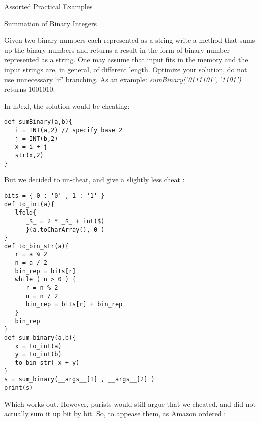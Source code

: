 \begin{section}{Assorted Practical Examples}
\begin{subsection}{Summation of Binary Integers}

Given two binary numbers each represented as a string write a method that sums up the binary numbers 
and returns a result in the form of binary number represented as a string. 
One may assume that input fits in the memory and the input strings are, in general, of different length. 
Optimize your solution, do not use unnecessary `if' branching. 
As an example: \emph{sumBinary('0111101', '1101')} returns  $1001010$.

In nJexl, the solution would be cheating:
\begin{center}\begin{minipage}{\linewidth}
\begin{lstlisting}[style=JexlStyle]
def sumBinary(a,b){
   i = INT(a,2) // specify base 2 
   j = INT(b,2)
   x = i + j 
   str(x,2)
}
\end{lstlisting}  
\end{minipage}\end{center}

But we decided to un-cheat, and give a slightly less cheat :

\begin{center}\begin{minipage}{\linewidth}
\begin{lstlisting}[style=JexlStyle]
bits = { 0 : '0' , 1 : '1' } 
def to_int(a){
   lfold{  
      _$_ = 2 * _$_ + int($)  
      }(a.toCharArray(), 0 )
} 
def to_bin_str(a){
   r = a % 2
   n = a / 2 
   bin_rep = bits[r]
   while ( n > 0 ) {
      r = n % 2 
      n = n / 2 
      bin_rep = bits[r] + bin_rep 
   }
   bin_rep 
} 
def sum_binary(a,b){
   x = to_int(a)
   y = to_int(b)
   to_bin_str( x + y)
}
s = sum_binary(__args__[1] , __args__[2] )
print(s)
\end{lstlisting}  
\end{minipage}\end{center}
Which works out. However, purists would still argue that we cheated, 
and did not actually sum it up bit by bit. So, to appease them, as Amazon ordered :


\end{subsection}
\end{section}

